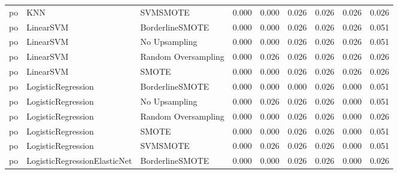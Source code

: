 \begin{tabular}{lllllllll}
      po &                          KNN &            SVMSMOTE & 0.000 &                     0.000 &                 0.026 &                  0.026 &                                   0.026 &     0.026 \\
      po &                    LinearSVM &     BorderlineSMOTE & 0.000 &                     0.000 &                 0.026 &                  0.026 &                                   0.026 &     0.051 \\
      po &                    LinearSVM &       No Upsampling & 0.000 &                     0.000 &                 0.026 &                  0.026 &                                   0.026 &     0.051 \\
      po &                    LinearSVM & Random Oversampling & 0.000 &                     0.026 &                 0.026 &                  0.026 &                                   0.026 &     0.026 \\
      po &                    LinearSVM &               SMOTE & 0.000 &                     0.000 &                 0.026 &                  0.026 &                                   0.026 &     0.026 \\
      po &           LogisticRegression &     BorderlineSMOTE & 0.000 &                     0.000 &                 0.000 &                  0.026 &                                   0.000 &     0.051 \\
      po &           LogisticRegression &       No Upsampling & 0.000 &                     0.026 &                 0.026 &                  0.026 &                                   0.000 &     0.051 \\
      po &           LogisticRegression & Random Oversampling & 0.000 &                     0.000 &                 0.026 &                  0.026 &                                   0.000 &     0.026 \\
      po &           LogisticRegression &               SMOTE & 0.000 &                     0.000 &                 0.026 &                  0.026 &                                   0.000 &     0.051 \\
      po &           LogisticRegression &            SVMSMOTE & 0.000 &                     0.026 &                 0.026 &                  0.026 &                                   0.000 &     0.051 \\
      po & LogisticRegressionElasticNet &     BorderlineSMOTE & 0.000 &                     0.000 &                 0.026 &                  0.026 &                                   0.000 &     0.026 \\

\end{tabular}
